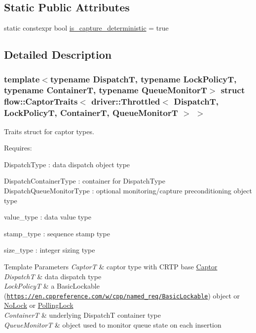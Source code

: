 \subsection*{Static Public Attributes}
\begin{DoxyCompactItemize}
\item 
static constexpr bool \hyperlink{structflow_1_1_captor_traits_3_01driver_1_1_throttled_3_01_dispatch_t_00_01_lock_policy_t_00_01_a55b272e8914e815b1e61540d6e370f1_a9f7dab8a0536fda23364cc6f86e8fc74}{is\+\_\+capture\+\_\+deterministic} = true
\end{DoxyCompactItemize}


\subsection{Detailed Description}
\subsubsection*{template$<$typename DispatchT, typename Lock\+PolicyT, typename ContainerT, typename Queue\+MonitorT$>$\newline
struct flow\+::\+Captor\+Traits$<$ driver\+::\+Throttled$<$ Dispatch\+T, Lock\+Policy\+T, Container\+T, Queue\+Monitor\+T $>$ $>$}

Traits struct for captor types. 

Requires\+:
\begin{DoxyItemize}
\item {\ttfamily Dispatch\+Type} \+: data dispatch object type
\item {\ttfamily Dispatch\+Container\+Type} \+: container for {\ttfamily Dispatch\+Type} {\ttfamily Dispatch\+Queue\+Monitor\+Type} \+: optional monitoring/capture preconditioning object type
\item {\ttfamily value\+\_\+type} \+: data value type
\item {\ttfamily stamp\+\_\+type} \+: sequence stamp type
\item {\ttfamily size\+\_\+type} \+: integer sizing type
\end{DoxyItemize}


\begin{DoxyTemplParams}{Template Parameters}
{\em CaptorT} & captor type with C\+R\+TP base {\ttfamily \hyperlink{classflow_1_1_captor}{Captor}}\\
\hline
{\em DispatchT} & data dispatch type \\
\hline
{\em Lock\+PolicyT} & a Basic\+Lockable (\href{https://en.cppreference.com/w/cpp/named_req/BasicLockable}{\tt https\+://en.\+cppreference.\+com/w/cpp/named\+\_\+req/\+Basic\+Lockable}) object or \hyperlink{structflow_1_1_no_lock}{No\+Lock} or \hyperlink{structflow_1_1_polling_lock}{Polling\+Lock} \\
\hline
{\em ContainerT} & underlying {\ttfamily DispatchT} container type \\
\hline
{\em Queue\+MonitorT} & object used to monitor queue state on each insertion \\
\hline
\end{DoxyTemplParams}


